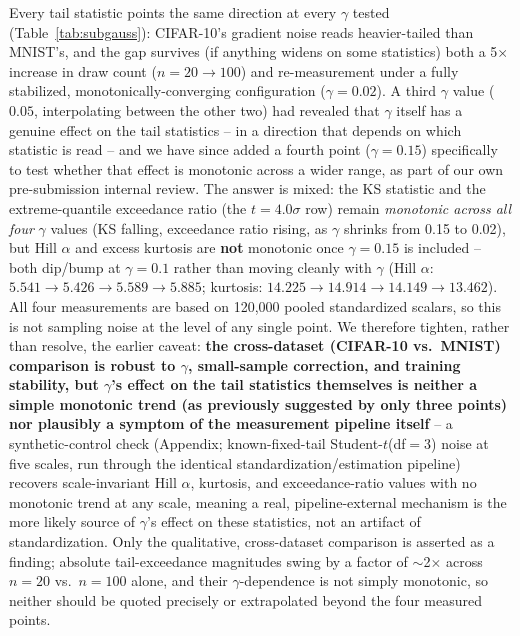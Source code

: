 \documentclass{article}
\begin{document}
Every tail statistic points the same direction at every $\gamma$ tested
(Table~\ref{tab:subgauss}): CIFAR-10's gradient noise reads heavier-tailed than
MNIST's, and the gap survives (if anything widens on some statistics) both a
5$\times$ increase in draw count ($n{=}20\to100$) and re-measurement under a
fully stabilized, monotonically-converging configuration ($\gamma{=}0.02$).
A third $\gamma$ value ($0.05$, interpolating between the other two) had
revealed that $\gamma$ itself has a genuine effect on the tail statistics --
in a direction that depends on which statistic is read -- and we have since
added a fourth point ($\gamma{=}0.15$) specifically to test whether that
effect is monotonic across a wider range, as part of our own pre-submission
internal review. The
answer is mixed: the KS statistic and the extreme-quantile exceedance ratio
(the $t{=}4.0\sigma$ row) remain \emph{monotonic across all four} $\gamma$
values (KS falling, exceedance ratio rising, as $\gamma$ shrinks from 0.15 to
0.02), but Hill $\alpha$ and excess kurtosis are \textbf{not} monotonic once
$\gamma{=}0.15$ is included -- both dip/bump at $\gamma{=}0.1$ rather than
moving cleanly with $\gamma$ (Hill $\alpha$: $5.541\to5.426\to5.589\to5.885$;
kurtosis: $14.225\to14.914\to14.149\to13.462$). All four measurements are
based on 120,000 pooled standardized scalars, so this is not sampling noise
at the level of any single point. We therefore tighten, rather than resolve,
the earlier caveat: \textbf{the cross-dataset (CIFAR-10 vs.\ MNIST)
comparison is robust to $\gamma$, small-sample correction, and training
stability, but $\gamma$'s effect on the tail statistics themselves is neither
a simple monotonic trend (as previously suggested by only three points) nor
plausibly a symptom of the measurement pipeline itself} -- a synthetic-control
check (Appendix; known-fixed-tail Student-$t$(df$=$3) noise at five scales,
run through the identical standardization/estimation pipeline) recovers
scale-invariant Hill $\alpha$, kurtosis, and exceedance-ratio values with no
monotonic trend at any scale, meaning a real, pipeline-external mechanism is
the more likely source of $\gamma$'s effect on these statistics, not an
artifact of standardization. Only the qualitative, cross-dataset comparison is
asserted as a finding; absolute tail-exceedance magnitudes swing by a factor
of $\sim$2$\times$ across $n{=}20$ vs.\ $n{=}100$ alone, and their
$\gamma$-dependence is not simply monotonic, so neither should be quoted
precisely or extrapolated beyond the four measured points.
\end{document}
